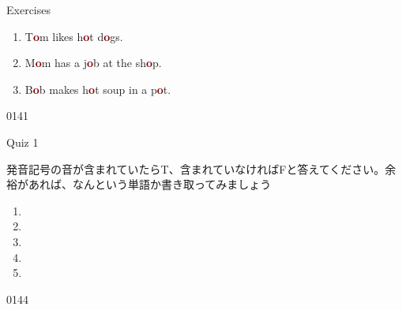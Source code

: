 \documentclass[aspectratio=169,xcolor={dvipsnames,table}]{beamer}
\begin{document}
\begin{frame}[plain]{Exercises }

\LARGE

\begin{enumerate}
 \item T\textcolor{Maroon}{\bfseries o}m likes h\textcolor{Maroon}{\bfseries o}t d\textcolor{Maroon}{\bfseries o}gs.
 \item M\textcolor{Maroon}{\bfseries o}m has a j\textcolor{Maroon}{\bfseries o}b  at the sh\textcolor{Maroon}{\bfseries o}p.
 \item B\textcolor{Maroon}{\bfseries o}b makes h\textcolor{Maroon}{\bfseries o}t soup in a p\textcolor{Maroon}{\bfseries o}t.
\end{enumerate}

\hfill{\tiny 0141}\,{\scriptsize {}}

\end{frame}
\begin{frame}[plain]{Quiz 1}

 発音記号\textipa{/\textscripta /}の音が含まれていたらT、含まれていなければFと答えてください。余裕があれば、なんという単語か書き取ってみましょう

\LARGE
\begin{enumerate}
 \item \mbox{}\hspace{40pt}\hspace{160pt}\mbox{}
 \item \mbox{}\hspace{40pt}\hspace{160pt}\mbox{}
 \item \mbox{}\hspace{40pt}\hspace{160pt}\mbox{}
 \item \mbox{}\hspace{40pt}\hspace{160pt}\mbox{}
 \item \mbox{}\hspace{40pt}\hspace{160pt}\mbox{}
\end{enumerate}

\hfill{\tiny 0144}\,{\scriptsize {}}

\end{frame}
\end{document}
